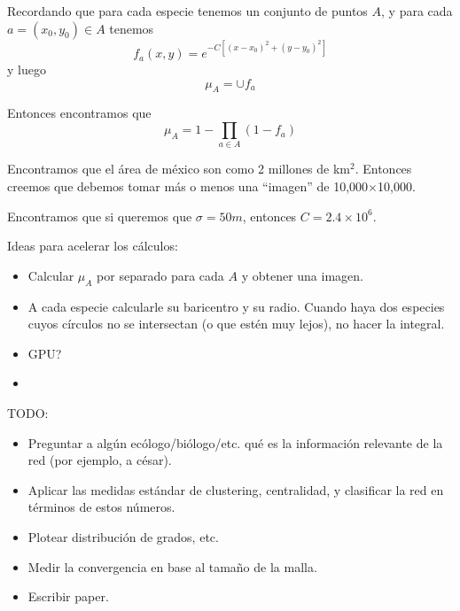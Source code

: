 \documentclass[a4paper,12pt]{article}
\begin{document}
  Recordando que para cada especie tenemos un conjunto de puntos $A$, y para cada $a=(x_0,y_0)\in A$ tenemos
		$$f_a(x,y) = e^{-C\left[(x-x_0)^2 + (y-y_0)^2\right]}$$
  y luego
		$$\mu_A = \cup f_a$$
	
	Entonces encontramos que
	$$\mu_A = 1-\prod_{a\in A} (1-f_a)$$
	
	Encontramos que el área de méxico son como 2 millones de km$^2$. Entonces creemos que debemos tomar más o menos una ``imagen'' de 10,000$\times$10,000.
	
	Encontramos que si queremos que $\sigma = 50m$, entonces $C = 2.4\times 10^6$.
	
	\vspace{1cm}
	Ideas para acelerar los cálculos:
	\begin{itemize}
	  \item Calcular $\mu_A$ por separado para cada $A$ y obtener una imagen.
		\item A cada especie calcularle su baricentro y su radio. Cuando haya dos especies cuyos círculos no se intersectan (o que estén muy lejos), no hacer la integral.
		\item GPU?
		\item 
	\end{itemize}
	
	TODO:
	
	\begin{itemize}
 		\item Preguntar a algún ecólogo/biólogo/etc. qué es la información relevante de la red (por ejemplo, a césar).
		\item Aplicar las medidas estándar de clustering, centralidad, y clasificar la red en términos de estos números.
		\item Plotear distribución de grados, etc.
		\item Medir la convergencia en base al tamaño de la malla.
		\item Escribir paper.
	\end{itemize}
\end{document}

